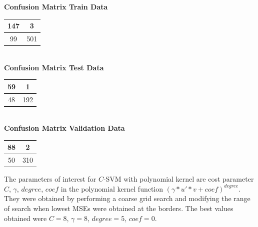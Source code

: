 \documentclass{article}
\begin{document}
\begin{flushleft}
\textbf{Confusion Matrix Train Data\\[5pt]}
\begin{tabular}{|c|c|}
\hline
147 & 3 \\
\hline
99 & 501\\
\hline
\end{tabular}
\textbf{\\[10pt] Confusion Matrix Test Data \\[5pt]}
\begin{tabular}{|c|c|}
\hline
59 & 1 \\
\hline
48 & 192\\
\hline
\end{tabular}
\textbf{\\[10pt] Confusion Matrix Validation Data \\[5pt]}
\begin{tabular}{|c|c|}
\hline
88 & 2 \\
\hline
50 & 310\\
\hline
\end{tabular}
\end{flushleft}

The parameters of interest for $C$-SVM with polynomial kernel are cost parameter $C$, $\gamma$, $degree$, $coef$ in the polynomial kernel function $(\gamma*u'*v+coef)^{degree}$. They were obtained by performing a coarse grid search and modifying the range of search when lowest MSEs were obtained at the borders.
The best values obtained were $C=8$, $\gamma=8$, $degree=5$, $coef=0$.
\end{document}
